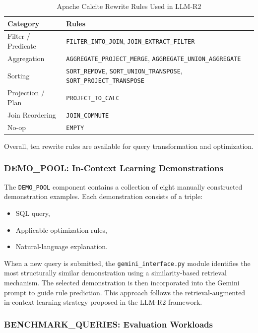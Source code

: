 \documentclass[12pt,a4paper]{article}
\begin{document}
\begin{table}[h]
\centering
\caption{Apache Calcite Rewrite Rules Used in LLM-R2}
\label{tab:calcite_rules}
\begin{tabular}{|l|p{8cm}|}
\hline
\textbf{Category} & \textbf{Rules} \\
\hline
Filter / Predicate &
\texttt{FILTER\_INTO\_JOIN},
\texttt{JOIN\_EXTRACT\_FILTER} \\
\hline
Aggregation &
\texttt{AGGREGATE\_PROJECT\_MERGE},
\texttt{AGGREGATE\_UNION\_AGGREGATE} \\
\hline
Sorting &
\texttt{SORT\_REMOVE},
\texttt{SORT\_UNION\_TRANSPOSE},
\texttt{SORT\_PROJECT\_TRANSPOSE} \\
\hline
Projection / Plan &
\texttt{PROJECT\_TO\_CALC} \\
\hline
Join Reordering &
\texttt{JOIN\_COMMUTE} \\
\hline
No-op &
\texttt{EMPTY} \\
\hline
\end{tabular}
\end{table}

Overall, ten rewrite rules are available for query transformation and optimization.

\subsubsection{DEMO\_POOL: In-Context Learning Demonstrations}

The \texttt{DEMO\_POOL} component contains a collection of eight manually constructed demonstration examples. Each demonstration consists of a triple:

\begin{itemize}
    \item SQL query,
    \item Applicable optimization rules,
    \item Natural-language explanation.
\end{itemize}

When a new query is submitted, the \texttt{gemini\_interface.py} module identifies the most structurally similar demonstration using a similarity-based retrieval mechanism. The selected demonstration is then incorporated into the Gemini prompt to guide rule prediction. This approach follows the retrieval-augmented in-context learning strategy proposed in the LLM-R2 framework.

\subsubsection{BENCHMARK\_QUERIES: Evaluation Workloads}
\end{document}
